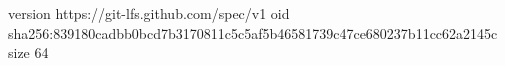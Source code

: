version https://git-lfs.github.com/spec/v1
oid sha256:839180cadbb0bcd7b3170811c5c5af5b46581739c47ce680237b11cc62a2145c
size 64
